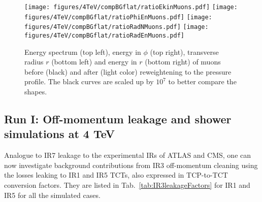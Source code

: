\begin{figure}
\begin{center}
  \texttt{[image: figures/4TeV/compBGflat/ratioEkinMuons.pdf]}
  \texttt{[image: figures/4TeV/compBGflat/ratioPhiEnMuons.pdf]}
  \texttt{[image: figures/4TeV/compBGflat/ratioRadNMuons.pdf]}
  \texttt{[image: figures/4TeV/compBGflat/ratioRadEnMuons.pdf]}
\end{center}
\vspace{-0.6cm}
 \caption{Energy spectrum (top left), energy in $\phi$ (top right), transverse radius $r$ (bottom left) and energy in $r$ (bottom right) of muons before (black) and after (light color) reweightening to the pressure profile. The black curves are scaled up by $10^7$ to better compare the shapes. %
  \label{fig:cv81EkinPhiEn4TeV}} 
\end{figure}

\clearpage
\newpage
\subsection{Run I: Off-momentum leakage and shower simulations at 4 TeV}

Analogue to IR7 leakage to the experimental IRs of ATLAS and CMS, one can now investigate background contributions from IR3 off-momentum cleaning using the losses leaking to IR1 and IR5 TCTs, also expressed in TCP-to-TCT conversion factors. They are listed in Tab.~\ref{tab:IR3leakageFactors} for IR1 and IR5 for all the simulated cases.


